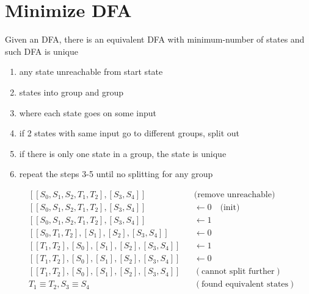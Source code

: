 \section*{Minimize DFA}
Given an DFA, there is an equivalent DFA with minimum-number of states and such DFA is unique
\begin{enumerate}
\item {} any state unreachable from start state
\item {} states into  group and  group
\item {} where each state goes on some input
\item if 2 states with same input go to different groups, split out
\item if there is only one state in a group, the state is unique
\item repeat the steps 3-5 until no splitting for any group
\end{enumerate}
\vspace{-1em}
\begin{minipage}{0.45\linewidth}
  \begin{align*}
    & [[S_{0},S_{1},S_{2},T_{1},T_{2}],[S_{3},S_{4}]] && \text{(remove unreachable)}\\
    & [[S_{0},S_{1},S_{2},T_{1},T_{2}],[S_{3},S_{4}]] && \leftarrow 0\quad \text{(init)}\\
    & [[S_{0},S_{1},S_{2},T_{1},T_{2}],[S_{3},S_{4}]] && \leftarrow 1\\
    & [[S_{0},T_{1},T_{2}],[S_{1}],[S_{2}],[S_{3},S_{4}]] && \leftarrow 0\\
    & [[T_{1},T_{2}],[S_{0}],[S_{1}],[S_{2}],[S_{3},S_{4}]] &&  \leftarrow 1\\
    & [[T_{1},T_{2}],[S_{0}],[S_{1}],[S_{2}],[S_{3},S_{4}]] &&  \leftarrow 0\\
    & [[T_{1},T_{2}],[S_{0}],[S_{1}],[S_{2}],[S_{3},S_{4}]] && (\text{cannot split further}) \\
    & T_{1} \equiv T_{2}, S_{3} \equiv S_{4} && (\text{found equivalent states})
  \end{align*}
\end{minipage}
